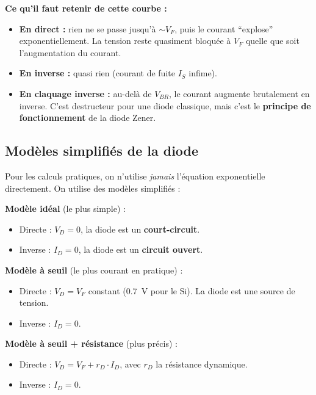 \documentclass[12pt,a4paper,twoside]{book}
\begin{document}
\begin{intuition}
\textbf{Ce qu'il faut retenir de cette courbe :}
\begin{itemize}[nosep]
\item \textbf{En direct :} rien ne se passe jusqu'à $\sim V_F$, puis le courant ``explose'' exponentiellement. La tension reste quasiment bloquée à $V_F$ quelle que soit l'augmentation du courant.
\item \textbf{En inverse :} quasi rien (courant de fuite $I_S$ infime).
\item \textbf{En claquage inverse :} au-delà de $V_{BR}$, le courant augmente brutalement en inverse. C'est destructeur pour une diode classique, mais c'est le \textbf{principe de fonctionnement} de la diode Zener.
\end{itemize}
\end{intuition}

\subsection{Modèles simplifiés de la diode}

Pour les calculs pratiques, on n'utilise \textit{jamais} l'équation exponentielle directement. On utilise des modèles simplifiés :

\begin{formule}
\textbf{Modèle idéal} (le plus simple) :
\begin{itemize}[nosep]
\item Directe : $V_D = 0$, la diode est un \textbf{court-circuit}.
\item Inverse : $I_D = 0$, la diode est un \textbf{circuit ouvert}.
\end{itemize}

\textbf{Modèle à seuil} (le plus courant en pratique) :
\begin{itemize}[nosep]
\item Directe : $V_D = V_F$ constant (\SI{0.7}{V} pour le Si). La diode est une source de tension.
\item Inverse : $I_D = 0$.
\end{itemize}

\textbf{Modèle à seuil + résistance} (plus précis) :
\begin{itemize}[nosep]
\item Directe : $V_D = V_F + r_D \cdot I_D$, avec $r_D$ la résistance dynamique.
\item Inverse : $I_D = 0$.
\end{itemize}
\end{formule}
\end{document}
